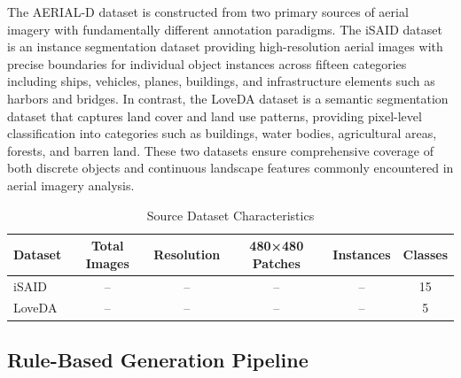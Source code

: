\noindent The AERIAL-D dataset is constructed from two primary sources of aerial imagery with fundamentally different annotation paradigms. The iSAID dataset is an instance segmentation dataset providing high-resolution aerial images with precise boundaries for individual object instances across fifteen categories including ships, vehicles, planes, buildings, and infrastructure elements such as harbors and bridges. In contrast, the LoveDA dataset is a semantic segmentation dataset that captures land cover and land use patterns, providing pixel-level classification into categories such as buildings, water bodies, agricultural areas, forests, and barren land. These two datasets ensure comprehensive coverage of both discrete objects and continuous landscape features commonly encountered in aerial imagery analysis.


\begin{table}[H]
\centering
\caption{Source Dataset Characteristics}
\label{tab:dataset_sources}
\begin{tabular}{@{}lccccc@{}}
\toprule
\textbf{Dataset} & \textbf{Total Images} & \textbf{Resolution} & \textbf{480×480 Patches} & \textbf{Instances} & \textbf{Classes} \\
\midrule
iSAID & -- & -- & -- & -- & 15 \\
LoveDA & -- & -- & -- & -- & 5 \\
\bottomrule
\end{tabular}
\end{table}



\subsection{Rule-Based Generation Pipeline}

